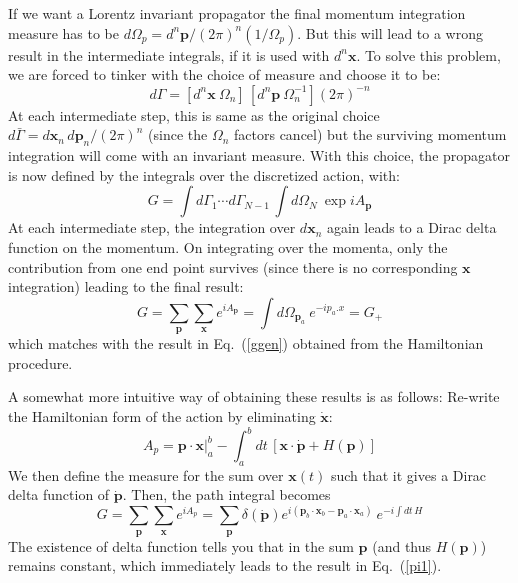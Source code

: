 \documentclass[12pt]{article}
\def\eq#1{{Eq.~(\ref{#1})}}
\begin{document}
If we want a Lorentz invariant propagator the final momentum integration measure has to be $d\Omega_p=d^n \bm{p}/(2\pi)^n(1/\Omega_p)$. But this will lead to a wrong result  in the intermediate integrals, if it is used with $d^n \bm{x}$.  To solve this problem, we are forced to  tinker with the choice of measure and choose it to be:
\begin{equation}
 d\Gamma = \left[ d^n \bm{x}\ \Omega_n\right]\, \left[ d^n \bm{p} \ \Omega_n^{-1}\right](2\pi)^{-n}
 \label{measure1}
\end{equation} 
At each intermediate step, this is same as the original choice $d\bar\Gamma=d\bm{x}_n \, d\bm{p}_n/(2\pi)^n$ (since the $\Omega_n$ factors cancel) but the surviving momentum integration will come with an invariant measure.
With this choice, the propagator is now defined by the integrals over the discretized action, with:
\begin{equation}
 G=\int d \Gamma_1 \cdots d \Gamma_{N-1} \, \int d\Omega_N \ \exp i A_{\bm p}
\end{equation} 
At each intermediate step, the  integration over $d\bm{x}_n$ again leads to a Dirac delta function on the momentum.  On integrating over the momenta, only the contribution from one end point  survives (since there is no corresponding $\bm{x}$ integration) leading to the final result: 
\begin{equation}
 G=\sum_{\bm{p}} \sum_{\bm{x}} e^{iA_{\bm{p}}} = \int d\Omega_{\bm{p}_a} \ e^{-i{p}_a. {x}}=G_+
 \label{pi1}
\end{equation}
which matches with the result in \eq{ggen} obtained from the Hamiltonian procedure. 

A somewhat more intuitive way of obtaining these results is as follows: Re-write the Hamiltonian form of the action by eliminating $\dot{\bm{x}}$:
\begin{equation}
 A_p = \bm{p\cdot x}\Big|^b_a - \int_a^b dt \, \left[ \bm{x\cdot \dot{p}} + H(\bm{p})\right]
\end{equation} 
We then define the measure for the sum over $\bm{x}(t)$ such that it  gives a Dirac delta function of $\dot{\bm{p}}$. Then,  the 
 path integral becomes
\begin{equation}
 G=\sum_{\bm{p}} \sum_{\bm{x}} e^{iA_p} =   \sum_{\bm{p}} \delta(\dot{\bm{p}}) e^{i(\bm{p}_b \cdot \bm{x}_b - \bm{p}_a \cdot \bm{x}_a)} \ e^{-i \int dt\, H}
\end{equation} 
The existence of delta function tells you that in the sum $\bm{p}$ (and thus $H(\bm{p})$) remains constant, which immediately leads to the result in \eq{pi1}.
\end{document}
